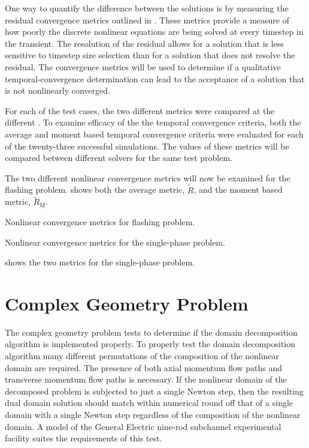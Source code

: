 One way to quantify the difference between the solutions is by measuring the residual convergence metrics outlined in .
These metrics provide a measure of how poorly the discrete nonlinear equations are being solved at every timestep in the transient.
The resolution of the residual allows for a solution that is less sensitive to timestep size selection than for a solution that does not resolve the residual.
The convergence metrics will be used to determine if a qualitative temporal-convergence determination can lead to the acceptance of a solution that is not nonlinearly converged.

For each of the test cases, the two different metrics were compared at the different \dtmax{}.
To examine efficacy of the the temporal convergence criteria, both the average and moment based temporal convergence criteria were evaluated for each of the twenty-three successful simulations.
The values of these metrics will be compared between different solvers for the same test problem. 

The two different nonlinear convergence metrics will now be examined for the flashing problem.
 shows both the average metric, $\tilde{R}$, and the moment based metric, $\tilde{R}_{\text{M}}$.

\begin{table}[h!t]
\centering
\singlespace

\caption{Nonlinear convergence metrics for flashing problem.}
\label{tab:flashing_criteria}
\end{table}

\begin{table}[h!t]
\centering
\singlespace

\caption{Nonlinear convergence metrics for the single-phase problem.}
\label{tab:single_criteria}
\end{table}

 shows the two metrics for the single-phase problem.

\section{Complex Geometry Problem}
\label{sect:complexProblem}
The complex geometry problem tests to determine if the domain decomposition algorithm is implemented properly.
To properly test the domain decomposition algorithm many different permutations of the composition of the nonlinear domain are required.
The presence of both axial momentum flow paths and transverse momentum flow paths is necessary.
If the nonlinear domain of the decomposed problem is subjected to just a single Newton step, then the resulting dual domain solution should match within numerical round off that of a single domain with a single Newton step regardless of the composition of the nonlinear domain.
A model of the General Electric nine-rod subchannel experimental facility \cite{Lahey1970} suites the requirements of this test.


